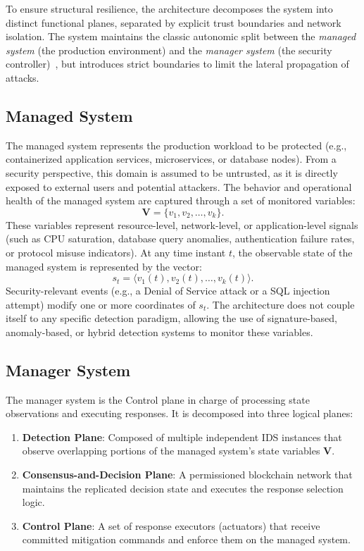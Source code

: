 To ensure structural resilience, the architecture decomposes the system into distinct functional planes, separated by explicit trust boundaries and network isolation. The system maintains the classic autonomic split between the \emph{managed system} (the production environment) and the \emph{manager system} (the security controller)~\cite{kephart2003vision, albero2026blockchain}, but introduces strict boundaries to limit the lateral propagation of attacks.

\subsection{Managed System}
\label{subsec:managed_system}

The managed system represents the production workload to be protected (e.g., containerized application services, microservices, or database nodes). From a security perspective, this domain is assumed to be untrusted, as it is directly exposed to external users and potential attackers. The behavior and operational health of the managed system are captured through a set of monitored variables:
\[
\mathbf{V} = \{v_1, v_2, \dots, v_k\}.
\]
These variables represent resource-level, network-level, or application-level signals (such as CPU saturation, database query anomalies, authentication failure rates, or protocol misuse indicators). At any time instant $t$, the observable state of the managed system is represented by the vector:
\[
s_t = \langle v_1(t), v_2(t), \dots, v_k(t)\rangle.
\]
Security-relevant events (e.g., a Denial of Service attack or a SQL injection attempt) modify one or more coordinates of $s_t$. The architecture does not couple itself to any specific detection paradigm, allowing the use of signature-based, anomaly-based, or hybrid detection systems to monitor these variables.

\subsection{Manager System}
\label{subsec:manager_system}

The manager system is the Control plane in charge of processing state observations and executing responses. It is decomposed into three logical planes:
\begin{enumerate}
    \item \textbf{Detection Plane}: Composed of multiple independent IDS instances that observe overlapping portions of the managed system's state variables $\mathbf{V}$.
    \item \textbf{Consensus-and-Decision Plane}: A permissioned blockchain network that maintains the replicated decision state and executes the response selection logic.
    \item \textbf{Control Plane}: A set of response executors (actuators) that receive committed mitigation commands and enforce them on the managed system.
\end{enumerate}

